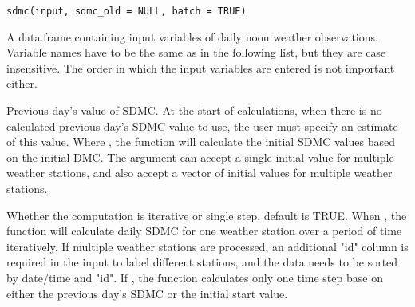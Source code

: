 \documentclass[a4paper]{book}
\begin{document}
%
\begin{Usage}
\begin{verbatim}
sdmc(input, sdmc_old = NULL, batch = TRUE)
\end{verbatim}
\end{Usage}
%
\begin{Arguments}
\begin{ldescription}
\item[\code{input}] A data.frame containing input variables of daily noon weather
observations. Variable names have to be the same as in the following list,
but they are case insensitive. The order in which the input variables are
entered is not important either.



\item[\code{sdmc\_old}] Previous day's value of SDMC. At the start of calculations,
when there is no calculated previous day's SDMC value to use, the user must
specify an estimate of this value.  Where , the function
will calculate the initial SDMC values based on the initial DMC. The
 argument can accept a single initial value for multiple
weather stations, and also accept a vector of initial values for multiple
weather stations.

\item[\code{batch}] Whether the computation is iterative or single step, default is
TRUE. When , the function will calculate daily SDMC for one
weather station over a period of time iteratively. If multiple weather
stations are processed, an additional "id" column is required in the input
to label different stations, and the data needs to be sorted by date/time
and "id".  If , the function calculates only one time step
base on either the previous day's SDMC or the initial start value.
\end{ldescription}
\end{Arguments}
\end{document}
